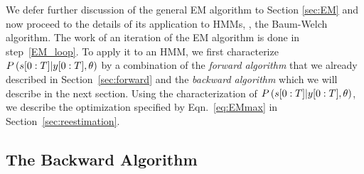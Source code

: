 We defer further discussion of the general EM algorithm to Section
\ref{sec:EM} and now proceed to the details of its application to
HMMs, \ie, the Baum-Welch algorithm.  The work of an iteration of the
EM algorithm is done in step~\ref{EM_loop}.  To apply it to an HMM, we
first characterize $P \left(s[0:T]|y[0:T], \theta
\right)$ by a combination of the \emph{forward algorithm} that we
already described in Section~\ref{sec:forward} and the \emph{backward
  algorithm} which we will describe in the next section.  Using the
characterization of $P \left(s[0:T]|y[0:T], \theta
\right)$, we describe the optimization specified by
Eqn.~\eqref{eq:EMmax} in Section~\ref{sec:reestimation}.

\subsection{The Backward Algorithm}
\label{sec:backward}

